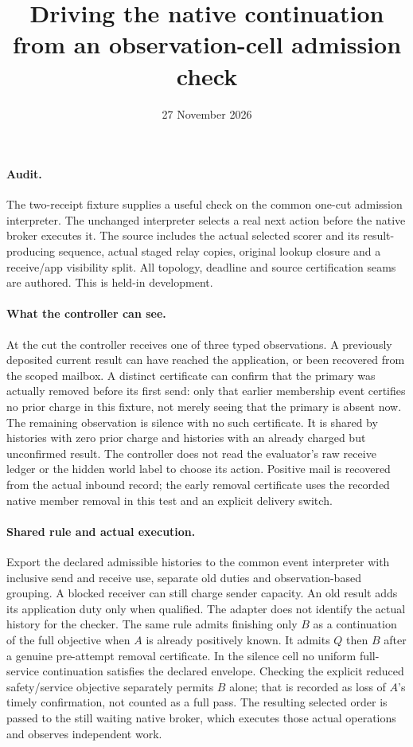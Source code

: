 \documentclass[11pt]{article}
\title{Driving the native continuation from an observation-cell admission check}
\date{27 November 2026}
\begin{document}
\maketitle
\paragraph{Audit.}
The two-receipt fixture supplies a useful check on the
common one-cut admission interpreter. The unchanged
interpreter selects a real next action before the native
broker executes it. The source includes the actual selected
scorer and its result-producing sequence, actual staged
relay copies, original lookup closure and a receive/app
visibility split. All topology, deadline and source
certification seams are authored. This is held-in development.

\paragraph{What the controller can see.}
At the cut the controller receives one of three typed
observations. A previously deposited current result can
have reached the application, or been recovered from
the scoped mailbox. A distinct certificate can confirm
that the primary was actually removed before its first
send: only that earlier membership event certifies no
prior charge in this fixture, not merely seeing that
the primary is absent now. The remaining observation
is silence with no such certificate. It is shared by
histories with zero prior charge and histories with an
already charged but unconfirmed result. The controller
does not read the evaluator's raw receive ledger or
the hidden world label to choose its action. Positive
mail is recovered from the actual inbound record; the
early removal certificate uses the recorded native member
removal in this test and an explicit delivery switch.

\paragraph{Shared rule and actual execution.}
Export the declared admissible histories to the common
event interpreter with inclusive send and receive use,
separate old duties and observation-based grouping.
A blocked receiver can still charge sender capacity.
An old result adds its application duty only when
qualified. The adapter does not identify the actual
history for the checker. The same rule admits finishing
only \(B\) as a continuation of the full objective when
\(A\) is already positively known. It admits \(Q\) then
\(B\) after a genuine pre-attempt removal certificate.
In the silence cell no uniform full-service continuation
satisfies the declared envelope. Checking the explicit
reduced safety/service objective separately permits \(B\)
alone; that is recorded as loss of \(A\)'s timely
confirmation, not counted as a full pass.
The resulting selected order is passed to the still
waiting native broker, which executes those actual
operations and observes independent work.
\end{document}
